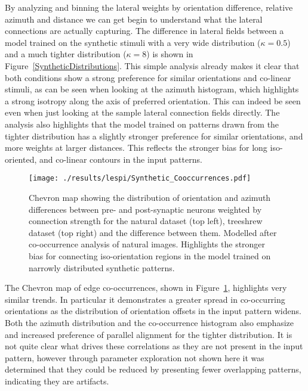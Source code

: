 By analyzing and binning the lateral weights by orientation
difference, relative azimuth and distance we can get begin to
understand what the lateral connections are actually capturing. The
difference in lateral fields between a model trained on the synthetic
stimuli with a very wide distribution ($\kappa=0.5$) and a much
tighter distribution ($\kappa=8$) is shown in
Figure~\ref{SyntheticDistributions}. This simple analysis already
makes it clear that both conditions show a strong preference for
similar orientations and co-linear stimuli, as can be seen when
looking at the azimuth histogram, which highlights a strong isotropy
along the axis of preferred orientation. This can indeed be seen even
when just looking at the sample lateral connection fields
directly. The analysis also highlights that the model trained on
patterns drawn from the tighter distribution has a slightly stronger
preference for similar orientations, and more weights at larger
distances. This reflects the stronger bias for long iso-oriented, and
co-linear contours in the input patterns.

\begin{figure}
	\centering
        \texttt{[image: ./results/lespi/Synthetic\_Cooccurrences.pdf]}
	\caption[Chevron map showing the distribution of orientation and
      azimuth differences between pre- and post-synaptic
      neurons.]{Chevron map showing the distribution of orientation
      and azimuth differences between pre- and post-synaptic neurons
      weighted by connection strength for the natural dataset (top
      left), treeshrew dataset (top right) and the difference between
      them. Modelled after \cite{Perrinet2015} co-occurrence analysis
      of natural images. Highlights the stronger bias for connecting
      iso-orientation regions in the model trained on narrowly
      distributed synthetic patterns.}
	\label{SyntheticCooccurrence}
\end{figure}

The Chevron map of edge co-occurrences, shown in
Figure~\ref{SyntheticCooccurrence}, highlights very similar trends. In
particular it demonstrates a greater spread in co-occurring
orientations as the distribution of orientation offsets in the input
pattern widens. Both the azimuth distribution and the co-occurrence
histogram also emphasize and increased preference of parallel
alignment for the tighter distribution. It is not quite clear what
drives these correlations as they are not present in the input
pattern, however through parameter exploration not shown here it was
determined that they could be reduced by presenting fewer overlapping
patterns, indicating they are artifacts.

